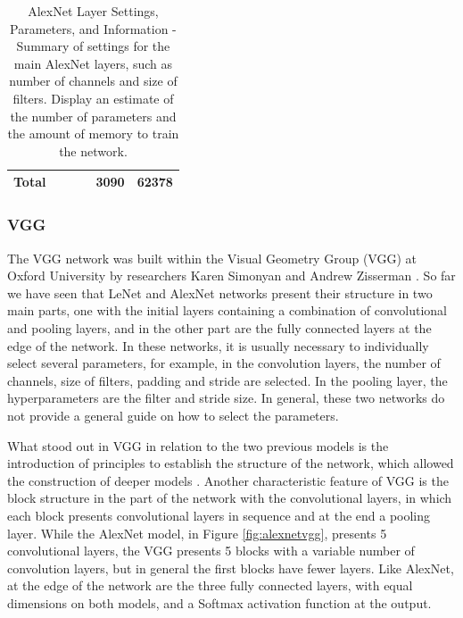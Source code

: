 \begin{center}
\begin{table}[]
\begin{tabular}{|l|c|c|c|c|c|}
Total             &                                                                &                                                               &                                                               & 3090                                                           & 62378               \\ \hline
\end{tabular}
\caption{AlexNet Layer Settings, Parameters, and Information - Summary of settings for the main AlexNet layers, such as number of channels and size of filters. Display an estimate of the number of parameters and the amount of memory to train the network.}

\label{table:tablealexnet}
\end{table}
\end{center}

\subsubsection{VGG} \label{vgg}

The VGG network was built within the Visual Geometry Group (VGG) at Oxford University by researchers Karen Simonyan and Andrew Zisserman \cite{zhang2020dive}. So far we have seen that LeNet and AlexNet networks present their structure in two main parts, one with the initial layers containing a combination of convolutional and pooling layers, and in the other part are the fully connected layers at the edge of the network. In these networks, it is usually necessary to individually select several parameters, for example, in the convolution layers, the number of channels, size of filters, padding and stride are selected. In the pooling layer, the hyperparameters are the filter and stride size. In general, these two networks do not provide a general guide on how to select the parameters.

What stood out in VGG in relation to the two previous models is the introduction of principles to establish the structure of the network, which allowed the construction of deeper models \cite{zhang2020dive}. Another characteristic feature of VGG is the block structure in the part of the network with the convolutional layers, in which each block presents convolutional layers in sequence and at the end a pooling layer. While the AlexNet model, in Figure \ref{fig:alexnetvgg}, presents 5 convolutional layers, the VGG presents 5 blocks with a variable number of convolution layers, but in general the first blocks have fewer layers. Like AlexNet, at the edge of the network are the three fully connected layers, with equal dimensions on both models, and a Softmax activation function at the output.

